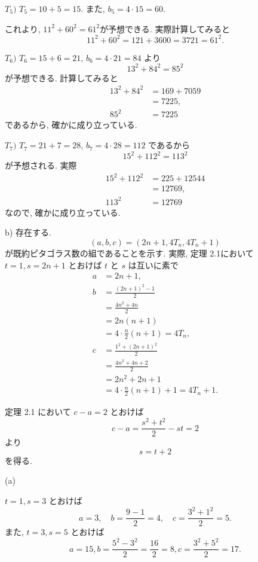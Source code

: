 \noindent $T_5)$ $T_5 = 10 + 5 = 15$. また, $b_5 = 4 \cdot 15 = 60$. %

これより, $11^2 + 60^2 = 61^2$が予想できる.
実際計算してみると
\[
  11^2 + 60^2 = 121 + 3600 = 3721 = 61^2.
\]

\noindent $T_6)$ %
$T_6 = 15 + 6 = 21$, $b_6 = 4 \cdot 21 = 84$ より
\[
  13^2 + 84^2 = 85^2
\]
が予想できる.
計算してみると
\begin{align*}
13^2 + 84^2
  &= 169 + 7059 \\
  &= 7225, \\
85^2 &= 7225
\end{align*}
であるから, 確かに成り立っている.

\noindent $T_7)$ %
$T_7 = 21 + 7 = 28$, $b_7 = 4 \cdot 28 = 112$ であるから
\[
  15^2 + 112^2 = 113^2
\]
が予想される.
実際
\begin{align*}
15^2 + 112^2
  &= 225 + 12544 \\
  &= 12769, \\
113^2 &= 12769
\end{align*}
なので, 確かに成り立っている.

\noindent b) %
存在する.
\[
  (a, b, c) = (2n+1, 4T_n, 4T_n + 1)
\]
が既約ピタゴラス数の組であることを示す.
実際, 定理 2.1において $t=1, s=2n+1$ とおけば $t$ と $s$ は互いに素で
\begin{align*}
a &= 2n + 1, \\
b
  &= \frac{(2n+1)^2 - 1}{2} \\
  &= \frac{4n^2 + 4n}{2} \\
  &= 2n(n+1) \\
  &= 4 \cdot \frac{n}{2} (n+1) = 4T_n, \\
c
  &= \frac{1^2 + (2n+1)^2}{2} \\
  &= \frac{4n^2 + 4n + 2}{2} \\
  &= 2n^2 + 2n + 1 \\
  &= 4 \cdot \frac{n}{2} (n+1) + 1 = 4T_n + 1.
\end{align*}



定理 2.1 において $c - a = 2$ とおけば
\[
  c - a = \frac{s^2 + t^2}{2} - st = 2
\]
より
\[
  s = t + 2
\]
を得る.


\noindent (a) %

$t = 1, s = 3$ とおけば
\[
  a = 3, \quad
  b = \frac{9 - 1}{2} = 4, \quad
  c = \frac{3^2 + 1^2}{2} = 5.
\]
また, $t=3, s=5$ とおけば
\[
  a = 15,
  b = \frac{5^2 - 3^2}{2} = \frac{16}{2} = 8,
  c = \frac{3^2 + 5^2}{2} = 17.
\]

